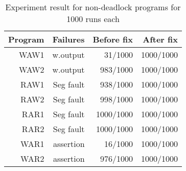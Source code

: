 \begin{table}[htbp]
  \centering
    \begin{tabular}{|r|r|r|r|} \hline
    Program & Failures & Before fix & After fix \\ \hline
    WAW1 & w.output & 31/1000 & 1000/1000 \\
    WAW2 & w.output & 983/1000 & 1000/1000 \\
    RAW1 & Seg fault & 938/1000 & 1000/1000 \\
    RAW2 & Seg fault & 998/1000 & 1000/1000 \\
    RAR1 & Seg fault & 1000/1000 & 1000/1000 \\
    RAR2 & Seg fault & 1000/1000 & 1000/1000 \\
    WAR1 & assertion & 16/1000 & 1000/1000 \\
    WAR2 & assertion & 976/1000 & 1000/1000 \\ \hline
    \end{tabular}%
  \caption{Experiment result for non-deadlock programs for 1000 runs each}
  \label{tab:nondl}%
\end{table}%
